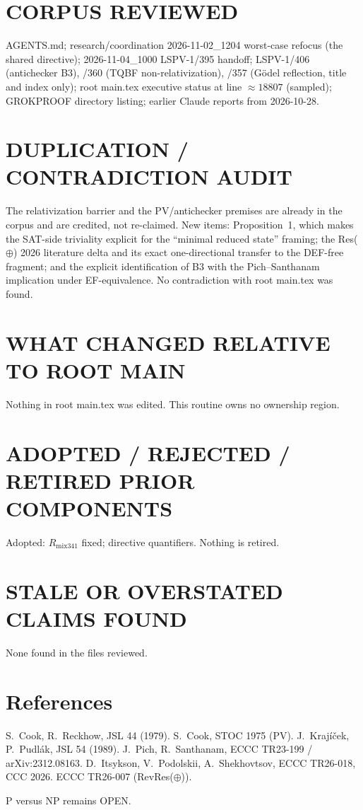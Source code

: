 \documentclass[11pt]{article}
\begin{document}
\section*{CORPUS REVIEWED}
AGENTS.md; research/coordination 2026-11-02\_1204 worst-case refocus (the shared directive);
2026-11-04\_1000 LSPV-1/395 handoff; LSPV-1/406 (antichecker B3), /360 (TQBF
non-relativization), /357 (Gödel reflection, title and index only); root main.tex executive
status at line ${\approx}18807$ (sampled); GROKPROOF directory listing; earlier Claude
reports from 2026-10-28.
\section*{DUPLICATION / CONTRADICTION AUDIT}
The relativization barrier and the PV/antichecker premises are already in the corpus and are
credited, not re-claimed. New items: Proposition~1, which makes the SAT-side triviality
explicit for the ``minimal reduced state'' framing; the Res($\oplus$) 2026 literature delta
and its exact one-directional transfer to the DEF-free fragment; and the explicit
identification of B3 with the Pich--Santhanam implication under EF-equivalence. No
contradiction with root main.tex was found.
\section*{WHAT CHANGED RELATIVE TO ROOT MAIN}
Nothing in root main.tex was edited. This routine owns no ownership region.
\section*{ADOPTED / REJECTED / RETIRED PRIOR COMPONENTS}
Adopted: $R_{\mathrm{mix341}}$ fixed; directive quantifiers. Nothing is retired.
\section*{STALE OR OVERSTATED CLAIMS FOUND}
None found in the files reviewed.

\section*{References}
S.~Cook, R.~Reckhow, JSL 44 (1979). S.~Cook, STOC 1975 (PV). J.~Krajíček, P.~Pudlák,
JSL 54 (1989). J.~Pich, R.~Santhanam, ECCC TR23-199 / arXiv:2312.08163.
D.~Itsykson, V.~Podolskii, A.~Shekhovtsov, ECCC TR26-018, CCC 2026.
ECCC TR26-007 (RevRes($\oplus$)).

\noindent P versus NP remains OPEN.
\end{document}
